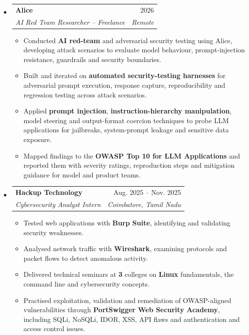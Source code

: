 \documentclass[a4paper,10pt]{article}
\makeatletter
\newcommand{\resumeItem}[1]{
  \item\small{
    {#1 \vspace{-2pt}}
  }
}
\newcommand{\resumeSubheading}[4]{
  \vspace{-2pt}\item
  \begin{tabular*}{0.97\textwidth}[t]{l@{\extracolsep{\fill}}r}
    \textbf{#1} & #2 \\
    \textit{\small#3} & \textit{\small #4} \\
  \end{tabular*}\vspace{-3pt}
}
\newenvironment{resumeSubHeadingList}{\begin{itemize}[leftmargin=0.15in, label={}]}{\end{itemize}}
\newenvironment{resumeItemList}{\begin{itemize}}{\end{itemize}}
\makeatother
\begin{document}
\begin{resumeSubHeadingList}
  \resumeSubheading
    {Alice}{2026}
    {AI Red Team Researcher -- Freelance}{Remote}
    \begin{resumeItemList}
      \resumeItem{Conducted \textbf{AI red-team} and adversarial security testing using Alice,
                   developing attack scenarios to evaluate model behaviour,
                   prompt-injection resistance, guardrails and security boundaries.}
      \resumeItem{Built and iterated on \textbf{automated security-testing harnesses} for
                   adversarial prompt execution, response capture,
                   reproducibility and regression testing across attack
                   scenarios.}
      \resumeItem{Applied \textbf{prompt injection}, \textbf{instruction-hierarchy manipulation},
                   model steering and output-format coercion techniques to
                   probe LLM applications for jailbreaks, system-prompt leakage
                   and sensitive data exposure.}
      \resumeItem{Mapped findings to the \textbf{OWASP Top 10 for LLM Applications} and
                   reported them with severity ratings, reproduction steps and
                   mitigation guidance for model and product teams.}
    \end{resumeItemList}
    \vspace{2pt}

  \resumeSubheading
    {Hackup Technology}{Aug. 2025 -- Nov. 2025}
    {Cybersecurity Analyst Intern}{Coimbatore, Tamil Nadu}
    \begin{resumeItemList}
      \resumeItem{Tested web applications with \textbf{Burp Suite}, identifying and
                   validating security weaknesses.}
      \resumeItem{Analysed network traffic with \textbf{Wireshark}, examining protocols and
                   packet flows to detect anomalous activity.}
      \resumeItem{Delivered technical seminars at \textbf{3} colleges on \textbf{Linux} fundamentals,
                   the command line and cybersecurity concepts.}
      \resumeItem{Practised exploitation, validation and remediation of OWASP-aligned
                   vulnerabilities through \textbf{PortSwigger Web Security Academy}, including
                   SQLi, NoSQLi, IDOR, XSS, API flaws and authentication and access control issues.}
    \end{resumeItemList}
\end{resumeSubHeadingList}

\newpage
\end{document}
